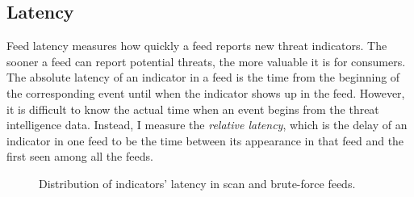 \subsection{Latency}
\label{sec:ip-timing}

Feed latency measures how quickly a feed reports new threat indicators. The
sooner a feed can report potential threats, the more valuable it is for
consumers. The absolute latency of an indicator in a feed is the time from
the beginning of the corresponding event until when the indicator shows up in
the feed. However, it is difficult to know the actual time when an event begins
from the threat intelligence data. Instead, I measure the \textit{relative
latency}, which is the delay of an indicator in one feed to be the time between
its appearance in that feed and the first seen among all the feeds.

\begin{figure}[t!]
\centering
{}


\caption{Distribution of indicators' latency in scan and brute-force feeds.}
\label{fig:firstseen}
\end{figure}


